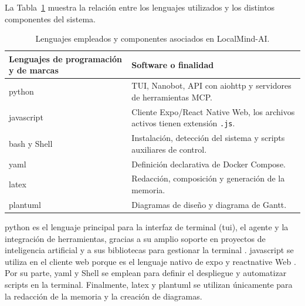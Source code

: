 La Tabla~\ref{tab:lenguajes-software-localmind} muestra la relación entre los lenguajes utilizados y los distintos componentes del sistema.

\begin{table}[h!tp]
    \centering
    \small
    \begin{tabularx}{\textwidth}{|>{\raggedright\arraybackslash}p{4.2cm}|>{\raggedright\arraybackslash}X|}
        \hline
        \textbf{Lenguajes de programación y de marcas} & \textbf{Software o finalidad}                                                      \\
        \hline
        \gls{python}                                   & TUI, Nanobot, API con \gls{aiohttp} y servidores de herramientas MCP.              \\
        \hline
        \gls{javascript}                               & Cliente Expo/React Native Web, los archivos activos tienen extensión \texttt{.js}. \\
        \hline
        \gls{bash} y Shell                             & Instalación, detección del sistema y scripts auxiliares de control.                \\
        \hline
        \gls{yaml}                                     & Definición declarativa de Docker Compose.                                          \\
        \hline
        \gls{latex}                                    & Redacción, composición y generación de la memoria.                                 \\
        \hline
        \gls{plantuml}                                 & Diagramas de diseño y diagrama de Gantt.                                           \\
        \hline
    \end{tabularx}
    \caption{Lenguajes empleados y componentes asociados en LocalMind-AI.}
    \label{tab:lenguajes-software-localmind}
\end{table}

\Gls{python} es el lenguaje principal para la interfaz de terminal (\gls{tui}), el agente y la integración de herramientas, gracias a su amplio soporte en proyectos de inteligencia artificial y a sus bibliotecas para gestionar la terminal \cite{WelcomePythonorg2025,pythontermios2026}. \Gls{javascript} se utiliza en el cliente web porque es el lenguaje nativo de \gls{expo} y \gls{reactnative} Web \cite{expo2024,meta2024reactnative}. Por su parte, \gls{yaml} y Shell se emplean para definir el despliegue y automatizar scripts en la terminal. Finalmente, \gls{latex} y \gls{plantuml} se utilizan únicamente para la redacción de la memoria y la creación de diagramas.


